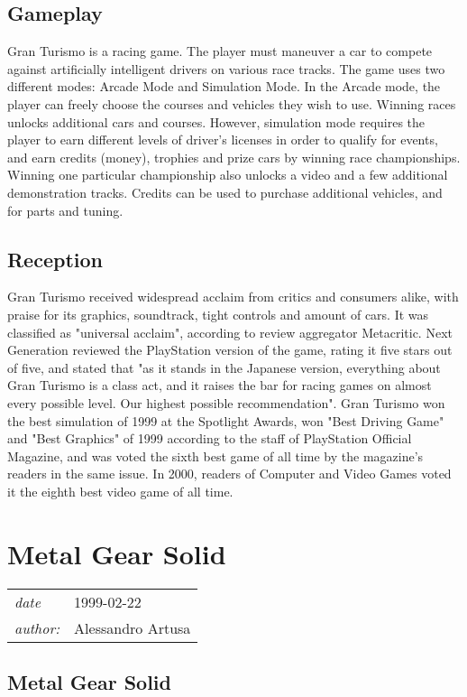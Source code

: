 \documentclass[a4paper,10pt]{book}
\newcommand{\pageHeader}[4]{
    \section{#1}
    \vspace{-0.3cm}
    \begin{table}[h!]
     \begin{tabular}{ll}
        \hline
        \textit{date} & #2 \\
        \textit{author: } & #3\\
        \hline
     \end{tabular}
    \end{table}
    \vspace{-0.3cm}
}
\begin{document}
 \subsection{Gameplay }
 
          Gran Turismo is a racing game. The player must maneuver a car to compete against artificially intelligent drivers on various race tracks. The game uses two different modes: Arcade Mode and Simulation Mode.  In the Arcade mode, the player can freely choose the courses and vehicles they wish to use.  Winning races unlocks additional cars and courses.
          However, simulation mode requires the player to earn different levels of driver's licenses in order to qualify for events, and earn credits (money), trophies and prize cars by winning race championships. Winning one particular championship also unlocks a video and a few additional demonstration tracks. Credits can be used to purchase additional vehicles, and for parts and tuning.
         
 \subsection{Reception }
 
          Gran Turismo received widespread acclaim from critics and consumers alike, with praise for its graphics, soundtrack, tight controls and amount of cars. It was classified as "universal acclaim", according to review aggregator Metacritic. 
          Next Generation reviewed the PlayStation version of the game, rating it five stars out of five, and stated that "as it stands in the Japanese version, everything about Gran Turismo is a class act, and it raises the bar for racing games on almost every possible level. Our highest possible recommendation". 
          Gran Turismo won the best simulation of 1999 at the Spotlight Awards, won "Best Driving Game" and "Best Graphics" of 1999 according to the staff of PlayStation Official Magazine, and was voted the sixth best game of all time by the magazine's readers in the same issue. In 2000, readers of Computer and Video Games voted it the eighth best video game of all time.
         
 \newpage\pageHeader{Metal Gear Solid}{1999-02-22}{Alessandro Artusa}{The page of Metal Gear Solid, the acclaimed stealth game by Hideo Kojima}
 \subsection{Metal Gear Solid }
 
\end{document}
